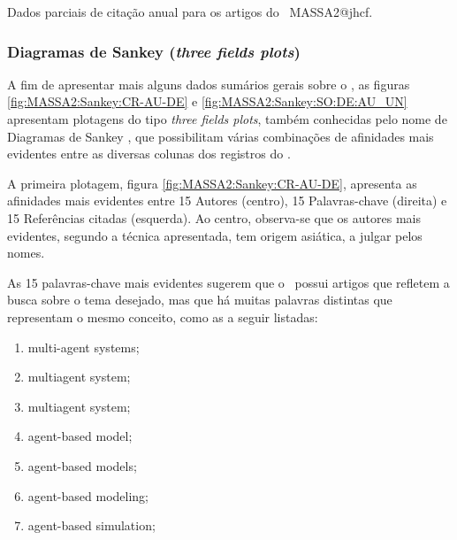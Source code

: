 \begin{table}[htp]
    \centering
{}
    \caption{Dados parciais de citação anual para os artigos do \dataset\   MASSA2@jhcf.}
    \label{tab:MASSA2:Media:Citacoes}
\end{table}

\subsubsection{Diagramas de Sankey (\textit{three fields plots})} 

A fim de apresentar mais alguns dados sumários gerais sobre  o \dataset, as figuras \ref{fig:MASSA2:Sankey:CR-AU-DE} e \ref{fig:MASSA2:Sankey:SO:DE:AU_UN} apresentam plotagens do tipo 
\textit{three fields plots}, também conhecidas pelo nome de Diagramas de Sankey \citep{riehmann_interactive_2005}, que possibilitam várias combinações de afinidades mais evidentes entre as diversas colunas dos registros do \dataset.

A primeira plotagem, figura \ref{fig:MASSA2:Sankey:CR-AU-DE}, apresenta as afinidades mais evidentes entre 15 Autores (centro), 15 Palavras-chave (direita) e 15 Referências citadas (esquerda). Ao centro, observa-se que os autores mais evidentes, segundo a técnica apresentada, tem origem asiática, a julgar pelos nomes. 

As 15 palavras-chave mais evidentes sugerem que o \dataset\ possui artigos que refletem a busca sobre o tema desejado, mas que há muitas palavras distintas que representam o mesmo conceito, como as a seguir listadas:
\begin{enumerate}
    \item multi-agent systems;
    \item multiagent system;
    \item multiagent system; 
    \item agent-based model;  
    \item agent-based models;
    \item agent-based modeling;
    \item agent-based simulation;
\end{enumerate}

